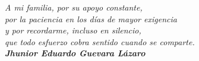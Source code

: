 \vspace{4cm}

\begin{flushright}
    \textit{A mi familia, por su apoyo constante,}\\
    \textit{por la paciencia en los días de mayor exigencia}\\
    \textit{y por recordarme, incluso en silencio,}\\
    \textit{que todo esfuerzo cobra sentido cuando se comparte.}\\[0.3cm]
    \textbf{\textit{Jhunior Eduardo Guevara Lázaro}}
\end{flushright}
